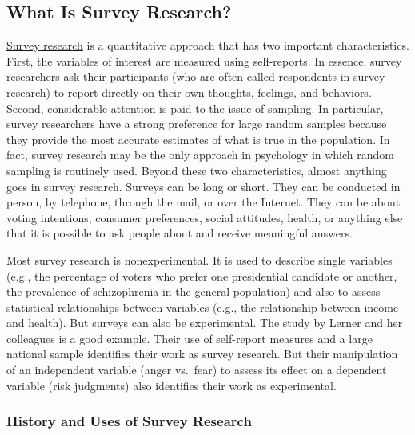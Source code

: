 \documentclass[
]{krantz}
\begin{document}
\subsection*{What Is Survey Research?}\label{what-is-survey-research}


\hyperref[survey-research]{Survey research} is a quantitative approach that has two important characteristics. First, the variables of interest are measured using self-reports. In essence, survey researchers ask their participants (who are often called \hyperref[respondent]{respondents} in survey research) to report directly on their own thoughts, feelings, and behaviors. Second, considerable attention is paid to the issue of sampling. In particular, survey researchers have a strong preference for large random samples because they provide the most accurate estimates of what is true in the population. In fact, survey research may be the only approach in psychology in which random sampling is routinely used. Beyond these two characteristics, almost anything goes in survey research. Surveys can be long or short. They can be conducted in person, by telephone, through the mail, or over the Internet. They can be about voting intentions, consumer preferences, social attitudes, health, or anything else that it is possible to ask people about and receive meaningful answers.

Most survey research is nonexperimental. It is used to describe single variables (e.g., the percentage of voters who prefer one presidential candidate or another, the prevalence of schizophrenia in the general population) and also to assess statistical relationships between variables (e.g., the relationship between income and health). But surveys can also be experimental. The study by Lerner and her colleagues is a good example. Their use of self-report measures and a large national sample identifies their work as survey research. But their manipulation of an independent variable (anger vs.~fear) to assess its effect on a dependent variable (risk judgments) also identifies their work as experimental.

\subsubsection*{History and Uses of Survey Research}\label{history-and-uses-of-survey-research}
\end{document}
